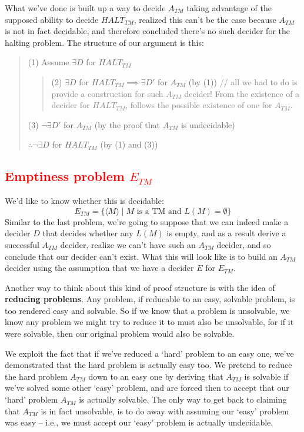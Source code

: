 \documentclass[11pt]{article}
\begin{document}
What we've done is built up a way to decide $A_{TM}$ taking advantage of the supposed ability to decide $HALT_{TM}$, realized this can't be the case because $A_{TM}$ is not in fact decidable, and therefore concluded there's no such decider for the halting problem. The structure of our argument is this:
\begin{quote}
(1) Assume $\exists D$ for $HALT_{TM}$ 
\begin{quote}
(2) $\exists D$ for $HALT_{TM} \implies \exists D'$ for $A_{TM}$ (by (1)) \textcolor{gray}{// all we had to do is provide a construction for such $A_{TM}$ decider! From the existence of a decider for $HALT_{TM}$, follows the possible existence of one for $A_{TM}$.}
\end{quote}
(3) $\neg \exists D'$ for $A_{TM}$ (by the proof that $A_{TM}$ is undecidable)

$\therefore \neg \exists D$ for $HALT_{TM}$ (by (1) and (3))
\end{quote}
\subsection{\textcolor{red}{Emptiness problem $E_{TM}$}}
We'd like to know whether this is decidable:
\[E_{TM} = \{\langle M \rangle \mid M \text{ is a TM and } L(M) = \emptyset\}\]
Similar to the last problem, we're going to suppose that we can indeed make a decider $D$ that decides whether any $L(M)$ is empty, and  as a result derive a successful $A_{TM}$ decider, realize we can't have such an $A_{TM}$ decider, and so conclude that our decider can't exist. What this will look like is to build an $A_{TM}$ decider using the assumption that we have a decider $E$ for $E_{TM}$. 

Another way to think about this kind of proof structure is with the idea of \textbf{reducing problems}. Any problem, if reducable to an easy, solvable problem, is too rendered easy and solvable. So if we know that a problem is unsolvable, we know any problem we might try to reduce it to must also be unsolvable, for if it were solvable, then our original problem would also be solvable.

We exploit the fact that if we've reduced a `hard' problem to an easy one, we've demonstrated that the hard problem is actually easy too. We pretend to reduce the hard problem $A_{TM}$ down to an easy one by deriving that $A_{TM}$ is solvable if we've solved some other `easy' problem, and are forced then to accept that our `hard' problem $A_{TM}$ is actually solvable. The only way to get back to claiming that $A_{TM}$ is in fact unsolvable, is to do away with assuming our `easy' problem was easy -- i.e., we must accept our `easy' problem is actually undecidable. 
\end{document}
